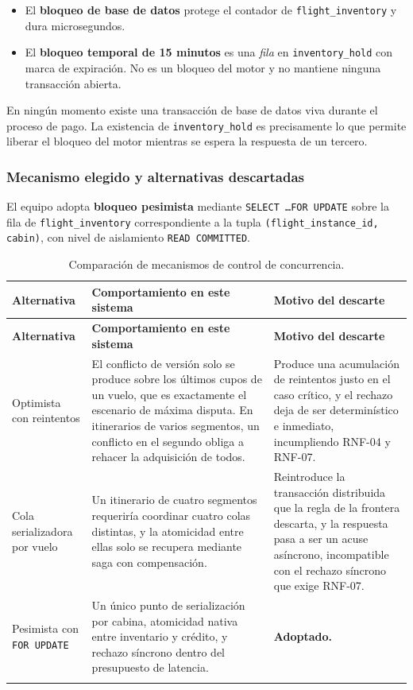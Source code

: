 \documentclass[10pt,letterpaper]{article}
\begin{document}
\begin{itemize}
  \item El \textbf{bloqueo de base de datos} protege el contador de \texttt{flight\_inventory} y dura microsegundos.
  \item El \textbf{bloqueo temporal de 15 minutos} es una \emph{fila} en \texttt{inventory\_hold} con marca de expiración. No es un bloqueo del motor y no mantiene ninguna transacción abierta.
\end{itemize}

En ningún momento existe una transacción de base de datos viva durante el proceso de pago. La existencia de \texttt{inventory\_hold} es precisamente lo que permite liberar el bloqueo del motor mientras se espera la respuesta de un tercero.

\subsubsection{Mecanismo elegido y alternativas descartadas}
El equipo adopta \textbf{bloqueo pesimista} mediante \texttt{SELECT \ldots FOR UPDATE} sobre la fila de \texttt{flight\_inventory} correspondiente a la tupla \texttt{(flight\_instance\_id, cabin)}, con nivel de aislamiento \texttt{READ COMMITTED}.

\begin{longtable}{@{}L{3.4cm} L{5.6cm} L{6.4cm}@{}}
\toprule \textbf{Alternativa} & \textbf{Comportamiento en este sistema} & \textbf{Motivo del descarte} \\ \midrule \endfirsthead
\toprule \textbf{Alternativa} & \textbf{Comportamiento en este sistema} & \textbf{Motivo del descarte} \\ \midrule \endhead
Optimista con reintentos & El conflicto de versión solo se produce sobre los últimos cupos de un vuelo, que es exactamente el escenario de máxima disputa. En itinerarios de varios segmentos, un conflicto en el segundo obliga a rehacer la adquisición de todos. & Produce una acumulación de reintentos justo en el caso crítico, y el rechazo deja de ser determinístico e inmediato, incumpliendo RNF-04 y RNF-07. \\
Cola serializadora por vuelo & Un itinerario de cuatro segmentos requeriría coordinar cuatro colas distintas, y la atomicidad entre ellas solo se recupera mediante saga con compensación. & Reintroduce la transacción distribuida que la regla de la frontera descarta, y la respuesta pasa a ser un acuse asíncrono, incompatible con el rechazo síncrono que exige RNF-07. \\
Pesimista con \texttt{FOR UPDATE} & Un único punto de serialización por cabina, atomicidad nativa entre inventario y crédito, y rechazo síncrono dentro del presupuesto de latencia. & \textbf{Adoptado.} \\
\bottomrule
\caption{Comparación de mecanismos de control de concurrencia.}
\end{longtable}
\end{document}
